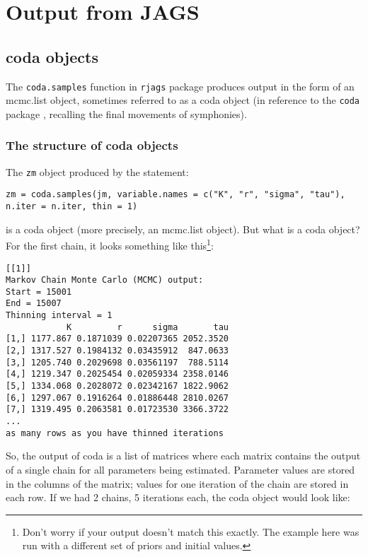 \documentclass[12pt,english]{article}
\begin{document}
\section{Output from JAGS}

\subsection{coda objects}

The \texttt{coda.samples} function in \texttt{rjags} package produces output in the form of an mcmc.list object, sometimes referred to as a coda object (in reference to the \texttt{coda} package \citep{Plummer2016coda}, recalling the final movements of symphonies). 


\subsubsection{The structure of coda objects}

The \texttt{zm} object produced by the statement:

\begin{Verbatim}
zm = coda.samples(jm, variable.names = c("K", "r", "sigma", "tau"), 
n.iter = n.iter, thin = 1)
\end{Verbatim}

\noindent is a coda object (more precisely, an mcmc.list object). But what is a coda object? For the first chain, it looks something like this\footnote{Don't worry if your output doesn't match this exactly. The example here was run with a different set of priors and initial values.}:

\begin{Verbatim}[fontsize=\small]
[[1]]
Markov Chain Monte Carlo (MCMC) output:
Start = 15001
End = 15007
Thinning interval = 1
            K         r      sigma       tau
[1,] 1177.867 0.1871039 0.02207365 2052.3520
[2,] 1317.527 0.1984132 0.03435912  847.0633
[3,] 1205.740 0.2029698 0.03561197  788.5114
[4,] 1219.347 0.2025454 0.02059334 2358.0146
[5,] 1334.068 0.2028072 0.02342167 1822.9062
[6,] 1297.067 0.1916264 0.01886448 2810.0267
[7,] 1319.495 0.2063581 0.01723530 3366.3722
...
as many rows as you have thinned iterations
\end{Verbatim}

\noindent So, the output of coda is a list of matrices where each matrix contains the output of a single chain for all parameters being estimated. Parameter values are stored in the columns of the matrix; values for one iteration of the chain are stored in each row. If we had 2 chains, 5 iterations each, the coda object would look like:
\end{document}
